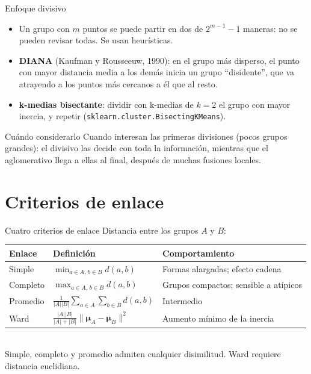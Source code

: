 \documentclass[aspectratio=169,11pt]{beamer}
\newcommand{\muv}{\bm{\mu}}
\begin{document}
\begin{frame}{Enfoque divisivo}
  \begin{itemize}
    \item Un grupo con $m$ puntos se puede partir en dos de $2^{m-1}-1$ maneras:
          no se pueden revisar todas. Se usan heurísticas.
    \item \textbf{DIANA} (Kaufman y Rousseeuw, 1990): en el grupo más disperso, el punto con
          mayor distancia media a los demás inicia un grupo ``disidente'', que va atrayendo
          a los puntos más cercanos a él que al resto.
    \item \textbf{k-medias bisectante}: dividir con k-medias de $k=2$ el grupo con mayor inercia,
          y repetir (\texttt{sklearn.cluster.BisectingKMeans}).
  \end{itemize}
  \vspace{6pt}
  \begin{block}{Cuándo considerarlo}
    Cuando interesan las primeras divisiones (pocos grupos grandes): el divisivo las decide
    con toda la información, mientras que el aglomerativo llega a ellas al final, después de
    muchas fusiones locales.
  \end{block}
\end{frame}

\section{Criterios de enlace}

\begin{frame}{Cuatro criterios de enlace}
  Distancia entre los grupos $A$ y $B$:
  \renewcommand{\arraystretch}{1.6}
  \begin{tabular}{@{}lll@{}}
    \toprule
    \textbf{Enlace} & \textbf{Definición} & \textbf{Comportamiento}\\
    \midrule
    Simple   & $\displaystyle\min_{a\in A,\,b\in B} d(a,b)$ & Formas alargadas; efecto \alert{cadena} \\
    Completo & $\displaystyle\max_{a\in A,\,b\in B} d(a,b)$ & Grupos compactos; sensible a atípicos \\
    Promedio & $\displaystyle\frac{1}{|A||B|}\sum_{a\in A}\sum_{b\in B} d(a,b)$ & Intermedio \\
    Ward     & $\displaystyle\frac{|A||B|}{|A|+|B|}\lVert\muv_A-\muv_B\rVert^2$ & Aumento mínimo de la inercia \\
    \bottomrule
  \end{tabular}
  \vspace{4pt}\\
  {\small Simple, completo y promedio admiten cualquier disimilitud. Ward requiere distancia euclidiana.}
\end{frame}
\end{document}
